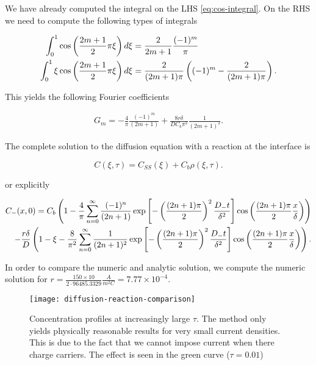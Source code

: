 We have already computed the integral on the LHS \ref{eq:cos-integral}. On the RHS we need to compute the following types of integrals

\begin{align}
	\int_0^1 \cos\left({\frac{2m+1}{2}\pi\xi}\right) d\xi &= \frac{2}{2m+1} \frac{(-1)^m}{\pi}\\
	\int_0^1 \xi \cos\left({\frac{2m+1}{2}\pi\xi}\right) d\xi &= \frac{2}{(2m+1)\pi} \left({(-1)^m -\frac{2}{(2m+1)\pi}}\right).
\end{align}

This yields the following Fourier coefficients

\begin{align}
	G_m = -\frac{4}{\pi}\frac{(-1)^m}{(2m+1)} + \frac{8r\delta}{DC_b\pi^2}\frac{1}{(2m+1)^2}.
\end{align}

The complete solution to the diffusion equation with a reaction at the interface is

$$C(\xi, \tau) = C_{SS}(\xi) + C_b \rho(\xi, \tau).$$

or explicitly

\begin{align}\nonumber
	C_-(x,0) = C_b\left({1- \frac{4}{\pi} \sum_{n=0}^\infty \frac{(-1)^n}{(2n+1)}\exp\left[{-\left({\frac{(2n+1)\pi}{2}}\right)^2\frac{D_- t}{\delta^2}}\right]\cos\left({\frac{(2n+1)\pi}{2} \frac{x}{\delta}}\right)}\right)\\ -\frac{r\delta}{D}\left({1-\xi - \frac{8}{\pi^2}\sum_{n=0}^\infty \frac{1}{(2n+1)^2}\exp\left[{-\left({\frac{(2n+1)\pi}{2}}\right)^2\frac{D_- t}{\delta^2}}\right]\cos\left({\frac{(2n+1)\pi}{2} \frac{x}{\delta}}\right)}\right).
	\label{eq:solution-diffusion}
\end{align}

\newpage
In order to compare the numeric and analytic solution, we compute the numeric solution for $r = \frac{150 \times 10 }{{2 \cdot  96 485.3329 }} \frac{A}{m^2 C} = 7.77\times 10^{-4}$.



\begin{figure}[htbp]
\centering
\texttt{[image: diffusion-reaction-comparison]}
\caption{Concentration profiles at increasingly large $\tau$. The method only yields physically reasonable results for very small  current densities. This is due to the fact that we cannot impose current when there charge carriers. The effect is seen in the green curve ($\tau = 0.01$)}
\label{fig:diffusion-reaction-comparison}
\end{figure}

